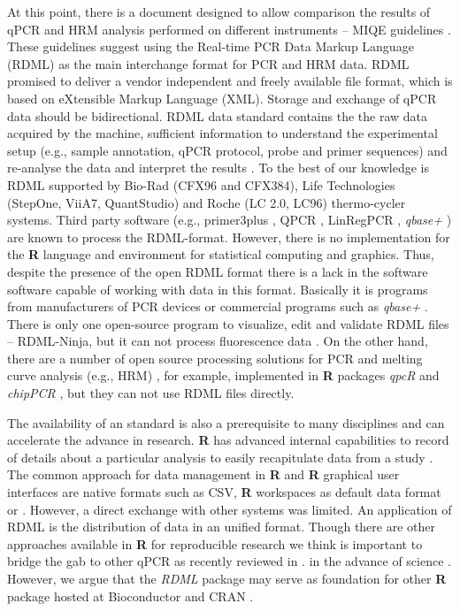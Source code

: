 \documentclass{bioinfo}
\begin{document}
At this point, there is a document designed to allow comparison the results of 
qPCR and HRM analysis performed on different instruments -- MIQE guidelines 
\cite{bustin_miqe_2009, huggett_2013}. These guidelines suggest using the 
Real-time PCR Data Markup Language (RDML) as the main interchange format for PCR 
and HRM data. RDML promised to deliver a vendor independent and freely available 
file format, which is based on eXtensible Markup Language (XML). Storage and 
exchange of qPCR data should be bidirectional. RDML data standard contains the 
the raw data acquired by the machine, sufficient information to understand the 
experimental setup (e.g., sample annotation, qPCR protocol, probe and primer 
sequences) and re-analyse the data and interpret the results 
\cite{lefever_rdml:_2009}. To the best of our knowledge is RDML supported by 
Bio-Rad (CFX96 and CFX384), Life Technologies (StepOne, ViiA7, QuantStudio) and 
Roche (LC 2.0, LC96) thermo-cycler systems. Third party software (e.g., 
primer3plus \cite{untergasser_2007}, QPCR \cite{pabinger_2009}, LinRegPCR 
\cite{ruijter_2014}, \textit{qbase+} \cite{hellemans_2007}) are known to process 
the RDML-format. However, there is no implementation for the \textbf{R} language 
and environment for statistical computing and graphics. Thus, despite the 
presence of the open RDML format there is a lack in the software software 
capable of working with data in this format. Basically it is programs from 
manufacturers of PCR devices or commercial programs such as \textit{qbase+} 
\cite{rdml}. There is only one open-source program to visualize, edit and validate RDML files -- RDML-Ninja, but it can not process fluorescence data \cite{}. On the other hand, there are a number of open source processing 
solutions for PCR and melting curve analysis (e.g., HRM) 
\cite{roediger_RJ_2013,cousins_2012}, for example, implemented in \textbf{R} 
packages \textit{qpcR}\cite{ritz_qpcr:_2008} and \textit{chipPCR} 
\cite{roediger_chippcr_2014}, but they can not use RDML files directly.

The availability of an standard is also a prerequisite to many disciplines and 
can accelerate the advance in research. \textbf{R} has advanced internal 
capabilities to record of details about a particular analysis to easily 
recapitulate data from a study \cite{liu_2014}. The common approach for data 
management in \textbf{R} and \textbf{R} graphical user interfaces are native 
formats such as CSV, \textbf{R} workspaces as default data format or 
\cite{rodiger_rkward_2012, pabinger_2014, RDCT2014c}. However, a direct exchange 
with other systems was limited. An application of RDML is the distribution of 
data in an unified format. Though there are other approaches available in 
\textbf{R} for reproducible research \cite{Leeper_2014} we think is important to 
bridge the gab to other qPCR as recently reviewed in \cite{pabinger_2014}. in 
the advance of science \cite{gentleman_2004}. However, we argue that the 
\textit{RDML} package may serve as foundation for other \textbf{R} package 
hosted at Bioconductor \cite{gentleman_2004} and CRAN \cite{RCT}.
\end{document}
